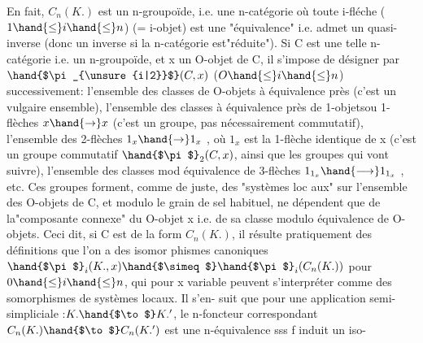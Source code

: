 En fait, $C_n(K.)$ est un n-groupoïde, i.e. une n-catégorie où toute
i-fléche ($1\hand{\leq} i\hand{\leq} n$) (= i-objet) est une "équivalence" i.e. admet un quasi-%
inverse (donc un inverse si la n-catégorie est"réduite"). Si C est une
telle n-catégorie i.e. un n-groupoïde, et x un O-objet de C, il s'impose
de désigner par $\hand{$\pi_{\unsure{i|2}}$}(C,x)$ ($O\hand{\leq} i\hand{\leq} n$) successivement: l'ensemble des classes
de O-objets à équivalence près (c'est un vulgaire ensemble), l'ensemble des
classes à équivalence près de 1-objets\hand{(}ou 1-flèches\hand{)} $x \hand{\to} x$ (c'est un groupe,
pas nécessairement commutatif), l'ensemble des  2-flèches $1_x \hand{\to} 1_x$ , où $1_x$
est la 1-flèche identique de x (c'est un groupe commutatif $\hand{$\pi$}_2(C,x)$, ainsi
que les groupes qui vont suivre), l'ensemble des classes mod équivalence
de 3-flèches $1_{1_x} \hand{\longrightarrow} 1_{1_x}$ , etc. Ces groupes forment, comme de juste, des
"systèmes loc aux" sur l'ensemble des O-objets de C, et modulo le grain de
sel habituel,  ne dépendent que de la"composante connexe" du O-objet x i.e.
de sa classe modulo équivalence de O-objets. Ceci dit, si C est de la form
$C_n(K.)$, il résulte pratiquement des définitions que  l'on a des isomor%
phismes canoniques $\hand{$\pi$}_i(K.,x)\hand{$\simeq$}\hand{$\pi$}_i(C_n(K.))$ pour $0\hand{\leq} i\hand{\leq} n$, qui pour x variable
peuvent s'interpréter comme des somorphismes de systèmes locaux. Il s'en-%
suit que pour une application semi-simpliciale :$K. \hand{$\to$} K.'$, le n-foncteur
correspondant $C_n(K.) \hand{$\to$} C_n(K.')$ est une n-équivalence sss f induit un iso-%


